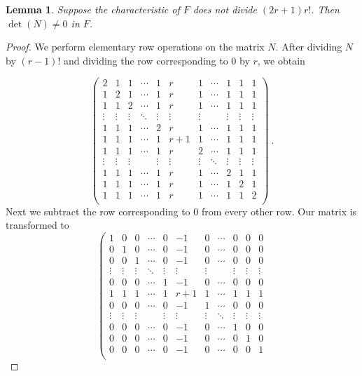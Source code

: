 \documentclass{amsproc}
\newtheorem{lemma}[theorem]{Lemma}
\theoremstyle{definition}
\theoremstyle{remark}
\numberwithin{equation}{section}
\begin{document}
\begin{lemma}\label{N_nonsingular}
Suppose the characteristic of $F$ does not divide $(2r+1)r!$. Then $\det(N) \neq 0$ in $F$.
\end{lemma}

\begin{proof}
We perform elementary row operations on the matrix $N$. After dividing $N$ by $(r-1)!$ and dividing
the row corresponding to $0$ by $r$, we obtain

\[\left(
\begin{array}{ccccccccccc}
2&1&1&\cdots&1&r&1&\cdots&1&1&1\\
1&2&1&\cdots&1&r&1&\cdots&1&1&1\\
1&1&2&\cdots&1&r&1&\cdots&1&1&1\\
\vdots&\vdots&\vdots&\ddots&\vdots&\vdots&\vdots&&\vdots&\vdots&\vdots\\
1&1&1&\cdots&2&r&1&\cdots&1&1&1\\
1&1&1&\cdots&1&r+1&1&\cdots&1&1&1\\
1&1&1&\cdots&1&r&2&\cdots&1&1&1\\
\vdots&\vdots&\vdots&&\vdots&\vdots&\vdots&\ddots&\vdots&\vdots&\vdots\\
1&1&1&\cdots&1&r&1&\cdots&2&1&1\\
1&1&1&\cdots&1&r&1&\cdots&1&2&1\\
1&1&1&\cdots&1&r&1&\cdots&1&1&2\\
\end{array}
\right)\ .\]
Next we subtract the row corresponding to $0$ from every other row. Our matrix is transformed to
\[\left(
\begin{array}{ccccccccccc}
1&0&0&\cdots&0&-1&0&\cdots&0&0&0\\
0&1&0&\cdots&0&-1&0&\cdots&0&0&0\\
0&0&1&\cdots&0&-1&0&\cdots&0&0&0\\
\vdots&\vdots&\vdots&\ddots&\vdots&\vdots&\vdots&&\vdots&\vdots&\vdots\\
0&0&0&\cdots&1&-1&0&\cdots&0&0&0\\
1&1&1&\cdots&1&r+1&1&\cdots&1&1&1\\
0&0&0&\cdots&0&-1&1&\cdots&0&0&0\\
\vdots&\vdots&\vdots&&\vdots&\vdots&\vdots&\ddots&\vdots&\vdots&\vdots\\
0&0&0&\cdots&0&-1&0&\cdots&1&0&0\\
0&0&0&\cdots&0&-1&0&\cdots&0&1&0\\
0&0&0&\cdots&0&-1&0&\cdots&0&0&1\\

\end{array}\]
\end{proof}
\end{document}

